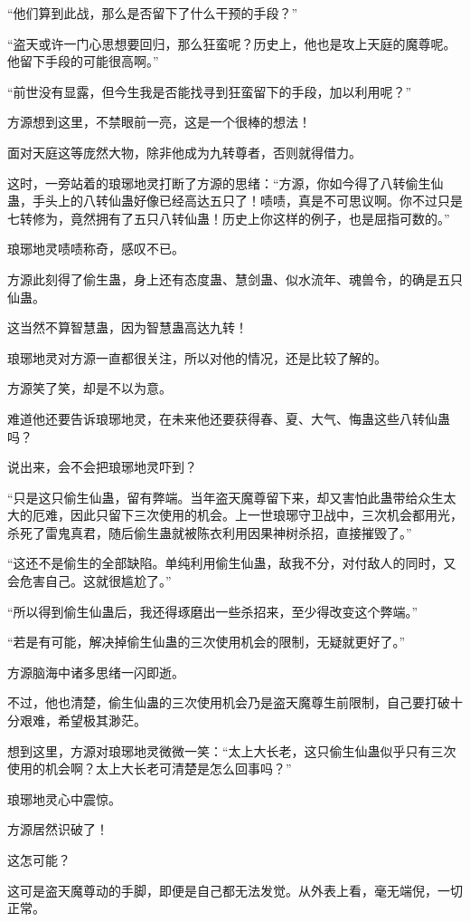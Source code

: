 \begin{this_body}
“他们算到此战，那么是否留下了什么干预的手段？”

“盗天或许一门心思想要回归，那么狂蛮呢？历史上，他也是攻上天庭的魔尊呢。他留下手段的可能很高啊。”

“前世没有显露，但今生我是否能找寻到狂蛮留下的手段，加以利用呢？”

方源想到这里，不禁眼前一亮，这是一个很棒的想法！

面对天庭这等庞然大物，除非他成为九转尊者，否则就得借力。

这时，一旁站着的琅琊地灵打断了方源的思绪：“方源，你如今得了八转偷生仙蛊，手头上的八转仙蛊好像已经高达五只了！啧啧，真是不可思议啊。你不过只是七转修为，竟然拥有了五只八转仙蛊！历史上你这样的例子，也是屈指可数的。”

琅琊地灵啧啧称奇，感叹不已。

方源此刻得了偷生蛊，身上还有态度蛊、慧剑蛊、似水流年、魂兽令，的确是五只仙蛊。

这当然不算智慧蛊，因为智慧蛊高达九转！

琅琊地灵对方源一直都很关注，所以对他的情况，还是比较了解的。

方源笑了笑，却是不以为意。

难道他还要告诉琅琊地灵，在未来他还要获得春、夏、大气、悔蛊这些八转仙蛊吗？

说出来，会不会把琅琊地灵吓到？

“只是这只偷生仙蛊，留有弊端。当年盗天魔尊留下来，却又害怕此蛊带给众生太大的厄难，因此只留下三次使用的机会。上一世琅琊守卫战中，三次机会都用光，杀死了雷鬼真君，随后偷生蛊就被陈衣利用因果神树杀招，直接摧毁了。”

“这还不是偷生的全部缺陷。单纯利用偷生仙蛊，敌我不分，对付敌人的同时，又会危害自己。这就很尴尬了。”

“所以得到偷生仙蛊后，我还得琢磨出一些杀招来，至少得改变这个弊端。”

“若是有可能，解决掉偷生仙蛊的三次使用机会的限制，无疑就更好了。”

方源脑海中诸多思绪一闪即逝。

不过，他也清楚，偷生仙蛊的三次使用机会乃是盗天魔尊生前限制，自己要打破十分艰难，希望极其渺茫。

想到这里，方源对琅琊地灵微微一笑：“太上大长老，这只偷生仙蛊似乎只有三次使用的机会啊？太上大长老可清楚是怎么回事吗？”

琅琊地灵心中震惊。

方源居然识破了！

这怎可能？

这可是盗天魔尊动的手脚，即便是自己都无法发觉。从外表上看，毫无端倪，一切正常。


\end{this_body}
